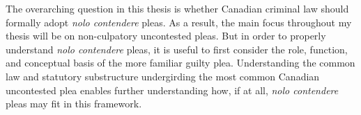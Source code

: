 The overarching question in this thesis is whether Canadian criminal law should formally adopt \textit{nolo contendere} pleas. As a result, the main focus throughout my thesis will be on non-culpatory uncontested pleas. But in order to properly understand \textit{nolo contendere} pleas, it is useful to first consider the role, function, and conceptual basis of the more familiar guilty plea. Understanding the common law and statutory substructure undergirding the most common Canadian uncontested plea enables further understanding how, if at all, \textit{nolo contendere} pleas may fit in this framework.